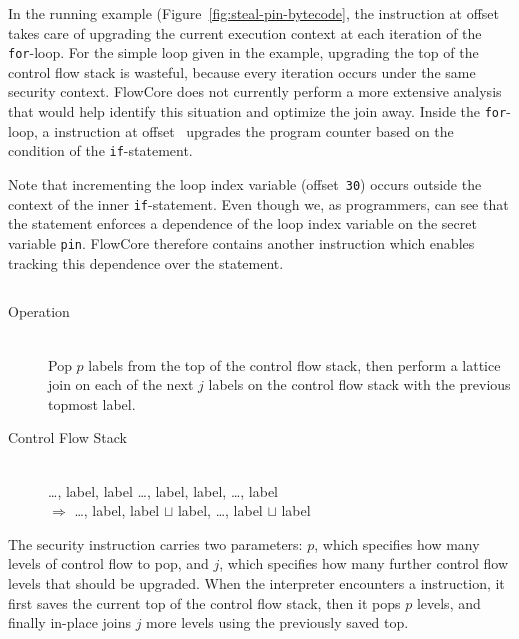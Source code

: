 In the running example (Figure~\ref{fig:steal-pin-bytecode}, the \join instruction at offset~ takes care of upgrading the current execution context at each iteration of the \texttt{for}-loop.
For the simple loop given in the example, upgrading the top of the control flow stack is wasteful, because every iteration occurs under the same security context.
FlowCore does not currently perform a more extensive analysis that would help identify this situation and optimize the join away.
Inside the \texttt{for}-loop, a \join instruction at offset~ upgrades the program counter based on the condition of the \texttt{if}-statement.

Note that incrementing the loop index variable (offset~\texttt{30}) occurs outside the context of the inner \texttt{if}-statement.
Even though we, as programmers, can see that the  statement enforces a dependence of the loop index variable on the secret variable \texttt{pin}.
FlowCore therefore contains another instruction which enables tracking this dependence over the  statement.

\subsection{\popj}

\begin{samepage}
\begin{description}
\item[Operation] \hfill \\
 Pop $p$ labels from the top of the control flow stack, then perform a lattice join on each of the next $j$ labels on the control flow stack with the previous topmost label.
\item[Control Flow Stack] \hfill \\
  \ldots, label, label \ldots, label, label, \ldots, label\\
 $\Rightarrow$
 \ldots, label, label $\sqcup$ label, \ldots, label $\sqcup$ label
\end{description}
\end{samepage}

The \popj security instruction carries two parameters: $p$, which specifies how many levels of control flow to pop, and $j$, which specifies how many further control flow levels that should be upgraded.
When the interpreter encounters a \popj instruction, it first saves the current top of the control flow stack, then it pops $p$ levels, and finally in-place joins $j$ more levels using the previously saved top.

